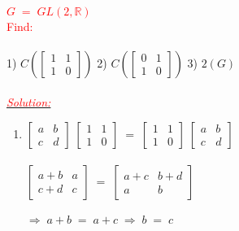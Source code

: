 \documentclass{report}
\newcounter{testexample}
\begin{document}
\begin{testexample}
\boxed{\emph{\underline{\textcolor{red}{Ex: 79}}}}\\
\newline
\textcolor{red}{$G \; = \; GL (2 , \mathbb{R})$}\\
\textcolor{red}{Find:}\\
\vspace{0.1cm}\\
1) \; $C\left(\begin{bmatrix}
1 & 1\\
1 & 0
\end{bmatrix}\right)$ \hspace{1cm} 2) \; $C \left(\begin{bmatrix}
0 & 1\\
1 & 0
\end{bmatrix}\right)$ \hspace{1cm} 3) $2(G)$\\
\vspace{0.2cm}\\
\emph{\underline{\textcolor{red}{Solution:}}}
\begin{enumerate}
\item $\begin{bmatrix}
a & b\\
c & d
\end{bmatrix} \; \begin{bmatrix}
1 & 1\\
1 & 0
\end{bmatrix} \; = \; \begin{bmatrix}
1 & 1\\
1 & 0
\end{bmatrix} \; \begin{bmatrix}
a & b\\
c & d
\end{bmatrix}$\\
\vspace{0.3cm}\\
$\begin{bmatrix}
a+b & a\\
c+d & c
\end{bmatrix} \; = \; \begin{bmatrix}
a+c & b+d\\
a & b
\end{bmatrix}$\\
\vspace{0.3cm}\\
$\Longrightarrow \; a + b \; = \; a +c \; \Longrightarrow \; b \; = \; c$\\

\end{enumerate}
\end{testexample}
\end{document}
